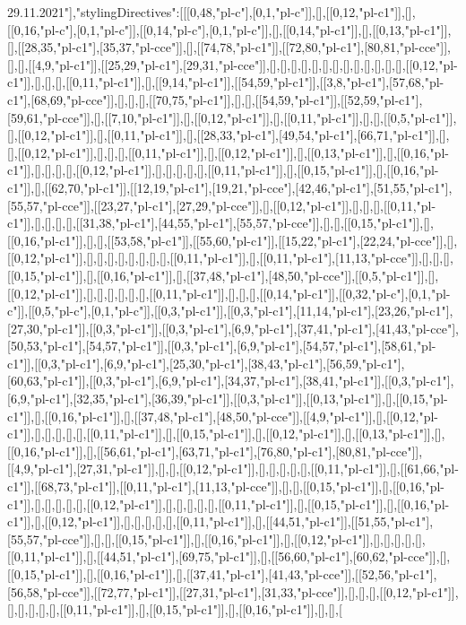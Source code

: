 29.11.2021"],"stylingDirectives":[[[0,48,"pl-c"],[0,1,"pl-c"]],[],[[0,12,"pl-c1"]],[],[[0,16,"pl-c"],[0,1,"pl-c"]],[[0,14,"pl-c"],[0,1,"pl-c"]],[],[[0,14,"pl-c1"]],[],[[0,13,"pl-c1"]],[],[[28,35,"pl-c1"],[35,37,"pl-cce"]],[],[[74,78,"pl-c1"]],[[72,80,"pl-c1"],[80,81,"pl-cce"]],[],[],[[4,9,"pl-c1"]],[[25,29,"pl-c1"],[29,31,"pl-cce"]],[],[],[],[],[],[],[],[],[],[],[],[],[],[[0,12,"pl-c1"]],[],[],[],[[0,11,"pl-c1"]],[],[[9,14,"pl-c1"]],[[54,59,"pl-c1"]],[[3,8,"pl-c1"],[57,68,"pl-c1"],[68,69,"pl-cce"]],[],[],[],[[70,75,"pl-c1"]],[],[],[[54,59,"pl-c1"]],[[52,59,"pl-c1"],[59,61,"pl-cce"]],[],[[7,10,"pl-c1"]],[],[[0,12,"pl-c1"]],[],[[0,11,"pl-c1"]],[],[],[[0,5,"pl-c1"]],[],[[0,12,"pl-c1"]],[],[[0,11,"pl-c1"]],[],[[28,33,"pl-c1"],[49,54,"pl-c1"],[66,71,"pl-c1"]],[],[],[[0,12,"pl-c1"]],[],[],[],[[0,11,"pl-c1"]],[],[[0,12,"pl-c1"]],[],[[0,13,"pl-c1"]],[],[[0,16,"pl-c1"]],[],[],[],[],[[0,12,"pl-c1"]],[],[],[],[],[],[[0,11,"pl-c1"]],[],[[0,15,"pl-c1"]],[],[[0,16,"pl-c1"]],[],[[62,70,"pl-c1"]],[[12,19,"pl-c1"],[19,21,"pl-cce"],[42,46,"pl-c1"],[51,55,"pl-c1"],[55,57,"pl-cce"]],[[23,27,"pl-c1"],[27,29,"pl-cce"]],[],[[0,12,"pl-c1"]],[],[],[],[[0,11,"pl-c1"]],[],[],[],[],[[31,38,"pl-c1"],[44,55,"pl-c1"],[55,57,"pl-cce"]],[],[],[[0,15,"pl-c1"]],[],[[0,16,"pl-c1"]],[],[],[[53,58,"pl-c1"]],[[55,60,"pl-c1"]],[[15,22,"pl-c1"],[22,24,"pl-cce"]],[],[[0,12,"pl-c1"]],[],[],[],[],[],[],[],[],[[0,11,"pl-c1"]],[],[[0,11,"pl-c1"],[11,13,"pl-cce"]],[],[],[],[[0,15,"pl-c1"]],[],[[0,16,"pl-c1"]],[],[[37,48,"pl-c1"],[48,50,"pl-cce"]],[[0,5,"pl-c1"]],[],[[0,12,"pl-c1"]],[],[],[],[],[],[],[[0,11,"pl-c1"]],[],[],[],[[0,14,"pl-c1"]],[[0,32,"pl-c"],[0,1,"pl-c"]],[[0,5,"pl-c"],[0,1,"pl-c"]],[[0,3,"pl-c1"]],[[0,3,"pl-c1"],[11,14,"pl-c1"],[23,26,"pl-c1"],[27,30,"pl-c1"]],[[0,3,"pl-c1"]],[[0,3,"pl-c1"],[6,9,"pl-c1"],[37,41,"pl-c1"],[41,43,"pl-cce"],[50,53,"pl-c1"],[54,57,"pl-c1"]],[[0,3,"pl-c1"],[6,9,"pl-c1"],[54,57,"pl-c1"],[58,61,"pl-c1"]],[[0,3,"pl-c1"],[6,9,"pl-c1"],[25,30,"pl-c1"],[38,43,"pl-c1"],[56,59,"pl-c1"],[60,63,"pl-c1"]],[[0,3,"pl-c1"],[6,9,"pl-c1"],[34,37,"pl-c1"],[38,41,"pl-c1"]],[[0,3,"pl-c1"],[6,9,"pl-c1"],[32,35,"pl-c1"],[36,39,"pl-c1"]],[[0,3,"pl-c1"]],[[0,13,"pl-c1"]],[],[[0,15,"pl-c1"]],[],[[0,16,"pl-c1"]],[],[[37,48,"pl-c1"],[48,50,"pl-cce"]],[[4,9,"pl-c1"]],[],[[0,12,"pl-c1"]],[],[],[],[],[],[[0,11,"pl-c1"]],[],[[0,15,"pl-c1"]],[],[[0,12,"pl-c1"]],[],[[0,13,"pl-c1"]],[],[[0,16,"pl-c1"]],[],[[56,61,"pl-c1"],[63,71,"pl-c1"],[76,80,"pl-c1"],[80,81,"pl-cce"]],[[4,9,"pl-c1"],[27,31,"pl-c1"]],[],[],[[0,12,"pl-c1"]],[],[],[],[],[],[[0,11,"pl-c1"]],[],[[61,66,"pl-c1"]],[[68,73,"pl-c1"]],[[0,11,"pl-c1"],[11,13,"pl-cce"]],[],[],[[0,15,"pl-c1"]],[],[[0,16,"pl-c1"]],[],[],[],[],[],[[0,12,"pl-c1"]],[],[],[],[],[],[[0,11,"pl-c1"]],[],[[0,15,"pl-c1"]],[],[[0,16,"pl-c1"]],[],[[0,12,"pl-c1"]],[],[],[],[],[],[[0,11,"pl-c1"]],[],[[44,51,"pl-c1"]],[[51,55,"pl-c1"],[55,57,"pl-cce"]],[],[],[[0,15,"pl-c1"]],[],[[0,16,"pl-c1"]],[],[[0,12,"pl-c1"]],[],[],[],[],[],[[0,11,"pl-c1"]],[],[[44,51,"pl-c1"],[69,75,"pl-c1"]],[],[[56,60,"pl-c1"],[60,62,"pl-cce"]],[],[[0,15,"pl-c1"]],[],[[0,16,"pl-c1"]],[],[[37,41,"pl-c1"],[41,43,"pl-cce"]],[[52,56,"pl-c1"],[56,58,"pl-cce"]],[[72,77,"pl-c1"]],[[27,31,"pl-c1"],[31,33,"pl-cce"]],[],[],[],[[0,12,"pl-c1"]],[],[],[],[],[],[[0,11,"pl-c1"]],[],[[0,15,"pl-c1"]],[],[[0,16,"pl-c1"]],[],[],[